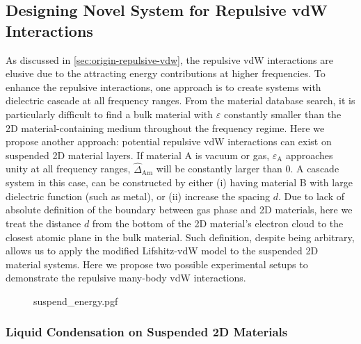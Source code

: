 \subsection{Designing Novel System for Repulsive vdW Interactions}
\label{sec:proposing-new-system}

As discussed in \autoref{sec:origin-repulsive-vdw}, the repulsive vdW
interactions are elusive due to the attracting energy contributions
at higher frequencies.
%
To enhance the repulsive interactions, one approach is to create systems with dielectric cascade at all frequency ranges.
%
From the material database search, it is particularly difficult to
find a bulk material with $\varepsilon$ constantly smaller than the 2D
material-containing medium throughout the frequency
regime. 
Here we propose another approach: potential repulsive vdW interactions
can exist on suspended 2D material layers. If material A is vacuum or
gas, $\varepsilon_{\mathrm{A}}$ approaches unity at all frequency
ranges, $\hat{\Delta}_{\mathrm{Am}}$ will be constantly larger than
0. A cascade system in this case, can be constructed by either (i)
having material B with large dielectric function (such as metal), or
(ii) increase the spacing $d$.
%
 Due to lack of absolute definition of the
boundary between gas phase and 2D materials, here we treat the
distance $d$ from the bottom of the 2D material's electron cloud to
the closest atomic plane in the bulk material.
%
Such definition, despite being arbitrary, 
allows us to apply the modified Lifshitz-vdW model to the suspended 2D
material systems.
%
Here we propose two possible experimental setups to demonstrate the
repulsive many-body vdW interactions.

\begin{figure}[h]
  \centering{}
  {suspend_energy.pgf}
  \caption{\label{fig:vdw-repul-suspen} %
  }
\end{figure}

\subsubsection{Liquid Condensation on Suspended 2D Materials}
\label{sec:liqu-cond-susp}

